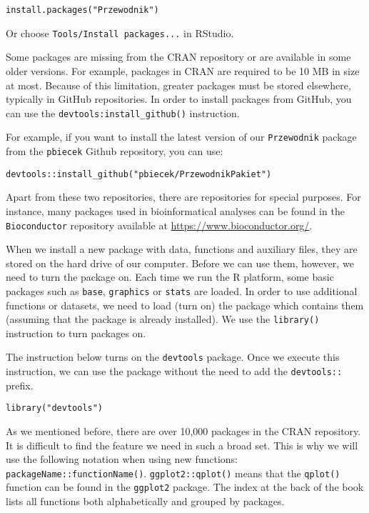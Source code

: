 \documentclass[]{book}
\theoremstyle{definition}
\theoremstyle{definition}
\theoremstyle{definition}
\theoremstyle{remark}
\begin{document}
\begin{verbatim}
install.packages("Przewodnik")
\end{verbatim}

Or choose \texttt{Tools/Install\ packages...} in RStudio.

Some packages are missing from the CRAN repository or are available in
some older versions. For example, packages in CRAN are required to be 10
MB in size at most. Because of this limitation, greater packages must be
stored elsewhere, typically in GitHub repositories. In order to install
packages from GitHub, you can use the
\texttt{devtools:install\_github()} instruction.

For example, if you want to install the latest version of our
\texttt{Przewodnik} package from the \texttt{pbiecek} Github repository,
you can use:

\begin{verbatim}
devtools::install_github("pbiecek/PrzewodnikPakiet")
\end{verbatim}

Apart from these two repositories, there are repositories for special
purposes. For instance, many packages used in bioinformatical analyses
can be found in the \texttt{Bioconductor} repository available at
\url{https://www.bioconductor.org/}.

When we install a new package with data, functions and auxiliary files,
they are stored on the hard drive of our computer. Before we can use
them, however, we need to turn the package on. Each time we run the R
platform, some basic packages such as \texttt{base}, \texttt{graphics}
or \texttt{stats} are loaded. In order to use additional functions or
datasets, we need to load (turn on) the package which contains them
(assuming that the package is already installed). We use the
\texttt{library()} instruction to turn packages on.

The instruction below turns on the \texttt{devtools} package. Once we
execute this instruction, we can use the package without the need to add
the \texttt{devtools::} prefix.

\begin{verbatim}
library("devtools")
\end{verbatim}

As we mentioned before, there are over 10,000 packages in the CRAN
repository. It is difficult to find the feature we need in such a broad
set. This is why we will use the following notation when using new
functions: \texttt{packageName::functionName()}.
\texttt{ggplot2::qplot()} means that the \texttt{qplot()} function can
be found in the \texttt{ggplot2} package. The index at the back of the
book lists all functions both alphabetically and grouped by packages.
\end{document}
